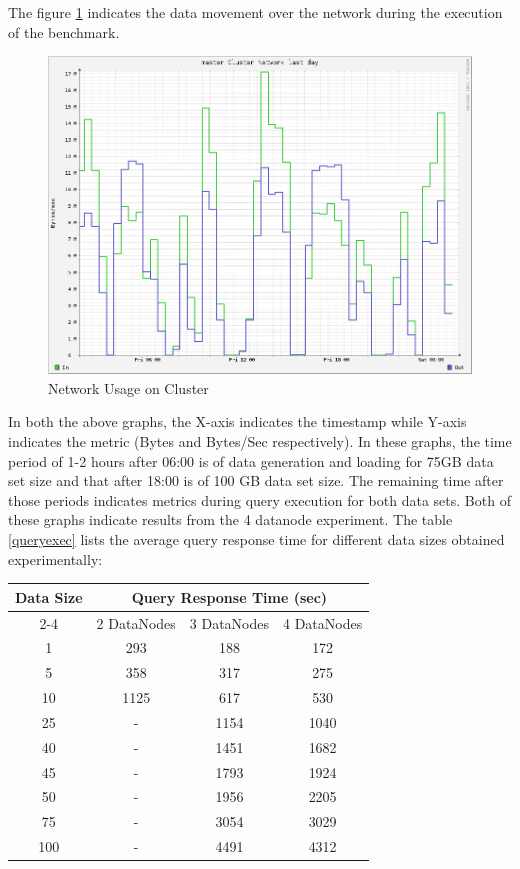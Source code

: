 \documentclass[12pt]{book}
\begin{document}
The figure \ref{network} indicates the data movement over the network during the execution of the benchmark.
\begin{figure}[H]
 \centering
 \includegraphics[width=15cm]{networkfinal.png}
\caption{Network Usage on Cluster \label{network}}
\end{figure}

In both the above graphs, the X-axis indicates the timestamp while Y-axis indicates the metric (Bytes and Bytes/Sec respectively).
In these graphs, the time period of 1-2 hours after 06:00 is of data generation and loading for 75GB data set size and that after 18:00 
is of 100 GB data set size. The remaining time after those periods indicates metrics during query execution for both data sets.
Both of these graphs indicate results from the 4 datanode experiment.
\newline
\newline
The table \ref{queryexec} lists the average query response time for different data sizes obtained experimentally:
\begin{center}\label{queryexec}
\begin{tabular}{|c|c|c|c|}\hline
\multirow{3}{*}{Data Size} & \multicolumn{3}{c|}{Query Response Time (sec)}\\
\cline{2-4}
& 2 DataNodes & 3 DataNodes & 4 DataNodes\\\hline
1 & 293 & 188 & 172\\
5 & 358 & 317 & 275\\
10 & 1125 & 617 & 530\\
25 & - & 1154 & 1040\\
40 & - & 1451 & 1682\\
45 & - & 1793 & 1924\\
50 & - & 1956 & 2205\\
75 & - & 3054 & 3029\\
100 & - & 4491 & 4312\\\hline
\end{tabular}
\end{center}
\end{document}
